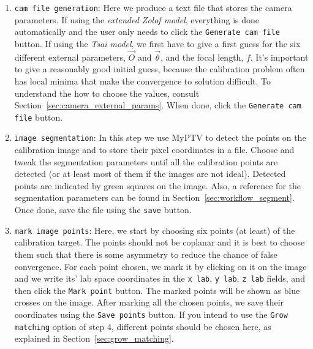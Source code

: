 \documentclass[10pt,a4paper]{article}
\begin{document}
\begin{enumerate}
	\item \texttt{cam file generation}: Here we produce a text file that stores the camera parameters. If using the \textit{extended Zolof model}, everything is done automatically and the user only needs to click the \texttt{Generate cam file} button. If using the \textit{Tsai model}, we first have to give a first guess for the six different external parameters, $\vec{O}$ and $\vec{\theta}$, and the focal length, $f$. It's important to give a reasonably good initial guess, because the calibration problem often has local minima that make the convergence to solution difficult. To understand the how to choose the values, consult Section~\ref{sec:camera_external_params}. When done, click the \texttt{Generate cam file} button.  
	
	\item \texttt{image segmentation}: In this step we use MyPTV to detect the points on the calibration image and to store their pixel coordinates in a file. Choose and tweak the segmentation parameters until all the calibration points are detected (or at least most of them if the images are not ideal). Detected points are indicated by green squares on the image. Also, a reference for the segmentation parameters can be found in Section~\ref{sec:workflow_segment}. Once done, save the file using the \texttt{save} button.
	
	\item \texttt{mark image points}: Here, we start by choosing six points (at least) of the calibration target. The points should not be coplanar and it is best to choose them such that there is some asymmetry to reduce the chance of false convergence. For each point chosen, we mark it by clicking on it on the image and we write its' lab space coordinates in the \texttt{x lab}, \texttt{y lab}, \texttt{z lab} fields, and then click the \texttt{Mark point} button. The marked points will be shown as blue crosses on the image. After marking all the chosen points, we save their coordinates using the \texttt{Save points} button. If you intend to use the \texttt{Grow matching} option of step 4, different points should be chosen here, as explained in Section~\ref{sec:grow_matching}.
	

\end{enumerate}
\end{document}
